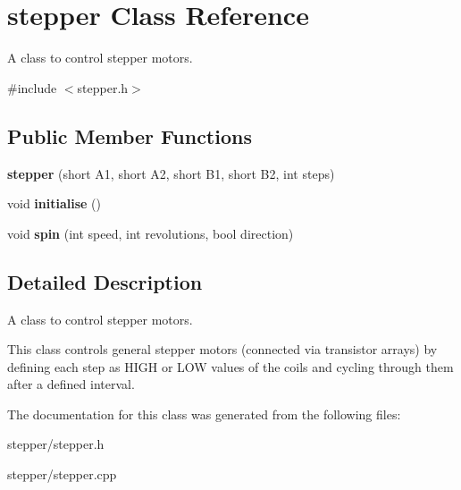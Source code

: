 \hypertarget{classstepper}{}\section{stepper Class Reference}
\label{classstepper}


A class to control stepper motors.  




{\ttfamily \#include $<$stepper.\+h$>$}

\subsection*{Public Member Functions}
\begin{DoxyCompactItemize}
\item 
\mbox{\label{classstepper_aceb54bf5d1838efdab59b04132ad3086}} 
{\bfseries stepper} (short A1, short A2, short B1, short B2, int steps)
\item 
\mbox{\label{classstepper_a469233d8e5e0712eb496c39cf4f79cc9}} 
void {\bfseries initialise} ()
\item 
\mbox{\label{classstepper_aaa1c9583e55db54218231560eeddadb2}} 
void {\bfseries spin} (int speed, int revolutions, bool direction)
\end{DoxyCompactItemize}


\subsection{Detailed Description}
A class to control stepper motors. 

This class controls general stepper motors (connected via transistor arrays) by defining each step as H\+I\+GH or L\+OW values of the coils and cycling through them after a defined interval. 

The documentation for this class was generated from the following files\+:\begin{DoxyCompactItemize}
\item 
stepper/stepper.\+h\item 
stepper/stepper.\+cpp\end{DoxyCompactItemize}
